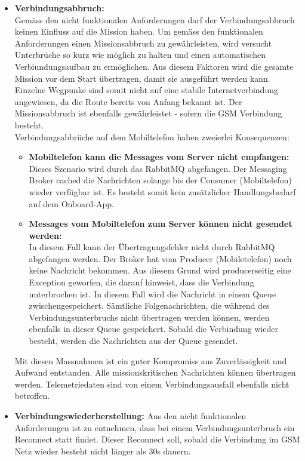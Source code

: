 \begin{itemize}
	\item{\textbf{Verbindungsabbruch:} \\
	Gemäss den nicht funktionalen Anforderungen darf der Verbindungsabbruch keinen Einfluss auf die Mission haben. Um gemäss den funktionalen Anforderungen einen Missionsabbruch zu gewährleisten, wird versucht Unterbrüche so kurz wie möglich zu halten und einen automatischen Verbiundungsaufbau zu ermöglichen. Aus diesem Faktoren wird die gesamte Mission vor dem Start übertragen, damit sie ausgeführt werden kann. Einzelne Wegpunke sind somit nicht auf eine stabile Internetverbindung angewiesen, da die Route bereits von Anfang bekannt ist. Der Missionsabbruch ist ebenfalls gewährleistet - sofern die GSM Verbindung besteht. 
	\\
	Verbindungsabbrüche auf dem Mobiltelefon haben zweierlei Konsequenzen:	
	\begin{itemize}
		\item{\textbf{Mobiltelefon kann die Messages vom Server nicht empfangen:} \\
		Dieses Szenario wird durch das RabbitMQ abgefangen. Der Messaging Broker cached die Nachrichten solange bis der Consumer (Mobiltelefon) wieder verfügbar ist. Es besteht somit kein zusätzlicher Handlungsbedarf auf dem Onboard-App.
		}
		\item{\textbf{Messages vom Mobiltelefon zum Server können nicht gesendet werden:} \\
		In diesem Fall kann der Übertragungsfehler nicht durch RabbitMQ abgefangen werden. Der Broker hat vom Producer (Mobiletelefon) noch keine Nachricht bekommen. Aus diesem Grund wird producerseitig eine Exception geworfen, die darauf hinweist, dass die Verbindung unterbrochen ist. In diesem Fall wird die Nachricht in einem Queue zwischengespeichert. Sämtliche Folgenachrichten, die während des Verbindungsunterbruchs nicht übertragen werden können, werden ebenfalls in dieser Queue gespeichert. Sobald die Verbindung wieder besteht, werden die Nachrichten aus der Queue gesendet.
		}
	\end{itemize}
	Mit diesen Massnahmen ist ein guter Kompromiss aus Zuverlässigkeit und Aufwand entstanden. Alle missionskritischen Nachrichten können übertragen werden. Telemetriedaten sind von einem Verbindungsausfall ebenfalls nicht betroffen.
	}
	\item{\textbf{Verbindungswiederherstellung:}
	Aus den nicht funktionalen Anforderungen ist zu entnehmen, dass bei einem Verbindungsunterbruch ein Reconnect statt findet. Dieser Reconnect soll, sobald die Verbindung im GSM Netz wieder besteht nicht länger als 30s dauern. \\
}
\end{itemize}
